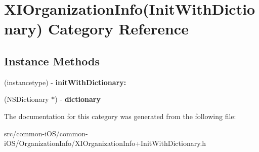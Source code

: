 \hypertarget{category_x_i_organization_info_07_init_with_dictionary_08}{}\section{X\+I\+Organization\+Info(Init\+With\+Dictionary) Category Reference}
\label{category_x_i_organization_info_07_init_with_dictionary_08}
\subsection*{Instance Methods}
\begin{DoxyCompactItemize}
\item 
\hypertarget{category_x_i_organization_info_07_init_with_dictionary_08_a67785830e09fe868e21c854b054fa771}{}\label{category_x_i_organization_info_07_init_with_dictionary_08_a67785830e09fe868e21c854b054fa771} 
(instancetype) -\/ {\bfseries init\+With\+Dictionary\+:}
\item 
\hypertarget{category_x_i_organization_info_07_init_with_dictionary_08_a9b5010b4e3246526d1c764384f759410}{}\label{category_x_i_organization_info_07_init_with_dictionary_08_a9b5010b4e3246526d1c764384f759410} 
(N\+S\+Dictionary $\ast$) -\/ {\bfseries dictionary}
\end{DoxyCompactItemize}


The documentation for this category was generated from the following file\+:\begin{DoxyCompactItemize}
\item 
src/common-\/i\+O\+S/common-\/i\+O\+S/\+Organization\+Info/X\+I\+Organization\+Info+\+Init\+With\+Dictionary.\+h\end{DoxyCompactItemize}
